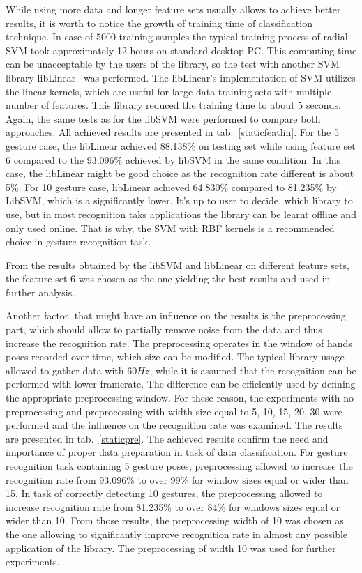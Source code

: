 While using more data and longer feature sets usually allows to achieve better results, it is worth to notice the growth of training time of classification technique. 
In case of $5000$ training samples the typical training process of radial SVM took approximately 12 hours on standard desktop PC. 
This computing time can be unacceptable by the users of the library, so the test with another SVM library libLinear~\cite{libLinear} was performed. 
The libLinear's implementation of SVM utilizes the linear kernels, which are useful for large data training sets with multiple number of features. 
This library reduced the training time to about 5 seconds.
Again, the same tests as for the libSVM were performed to compare both approaches.
All achieved results are presented in tab.~\ref{staticfeatlin}.
For the 5 gesture case, the libLinear achieved 88.138\% on testing set while using feature set 6 compared to the 93.096\% achieved by libSVM in the same condition.
In this case, the libLinear might be good choice as the recognition rate different is about 5\%.
For 10 gesture case, libLinear achieved 64.830\% compared to 81.235\% by LibSVM, which is a significantly lower.
It's up to user to decide, which library to use, but in most recognition taks applications the library can be learnt offline and only used online.
That is why, the SVM with RBF kernels is a recommended choice in gesture recognition task.

From the results obtained by the libSVM and libLinear on different feature sets, the feature set 6 was chosen as the one yielding the best results and used in further analysis.


Another factor, that might have an influence on the results is the preprocessing part, which should allow to partially remove noise from the data and thus increase the recognition rate. 
The preprocessing operates in the window of hands poses recorded over time, which size can be modified. 
The typical library usage allowed to gather data with $60Hz$, while it is assumed that the recognition can be performed with lower framerate. The difference can be efficiently used by defining the appropriate preprocessing window.
For these reason, the experiments with no preprocessing and preprocessing with width size equal to 5, 10, 15, 20, 30 were performed and the influence on the recognition rate was examined.
The results are presented in tab.~\ref{staticpre}.
The achieved results confirm the need and importance of proper data preparation in task of data classification.
For gesture recognition task containing 5 gesture poses, preprocessing allowed to increase the recognition rate from 93.096\% to over 99\% for window sizes equal or wider than 15. 
In task of correctly detecting 10 gestures, the preprocessing allowed to increase recognition rate from 81.235\% to over 84\% for windows sizes equal or wider than 10.
From those results, the preprocessing width of 10 was chosen as the one allowing to significantly improve recognition rate in almost any possible application of the library.
The preprocessing of width 10 was used for further experiments.

